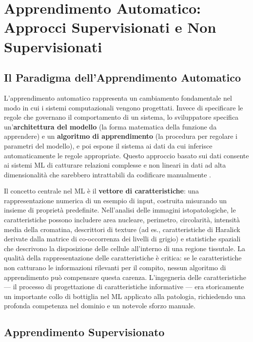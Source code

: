 \section{Apprendimento Automatico: Approcci Supervisionati e Non Supervisionati}
\label{sec:ch3_ml}

\subsection{Il Paradigma dell'Apprendimento Automatico}

L'apprendimento automatico rappresenta un cambiamento fondamentale nel modo in cui i sistemi computazionali vengono progettati. Invece di specificare le regole che governano il comportamento di un sistema, lo sviluppatore specifica un'\textbf{architettura del modello} (la forma matematica della funzione da apprendere) e un \textbf{algoritmo di apprendimento} (la procedura per regolare i parametri del modello), e poi espone il sistema ai dati da cui inferisce automaticamente le regole appropriate. Questo approccio basato sui dati consente ai sistemi ML di catturare relazioni complesse e non lineari in dati ad alta dimensionalità che sarebbero intrattabili da codificare manualmente \cite{komura2018}.

Il concetto centrale nel ML è il \textbf{vettore di caratteristiche}: una rappresentazione numerica di un esempio di input, costruita misurando un insieme di proprietà predefinite. Nell'analisi delle immagini istopatologiche, le caratteristiche possono includere area nucleare, perimetro, circolarità, intensità media della cromatina, descrittori di texture (ad es., caratteristiche di Haralick derivate dalla matrice di co-occorrenza dei livelli di grigio) e statistiche spaziali che descrivono la disposizione delle cellule all'interno di una regione tissutale. La qualità della rappresentazione delle caratteristiche è critica: se le caratteristiche non catturano le informazioni rilevanti per il compito, nessun algoritmo di apprendimento può compensare questa carenza. L'ingegneria delle caratteristiche — il processo di progettazione di caratteristiche informative — era storicamente un importante collo di bottiglia nel ML applicato alla patologia, richiedendo una profonda competenza nel dominio e un notevole sforzo manuale.

\subsection{Apprendimento Supervisionato}

